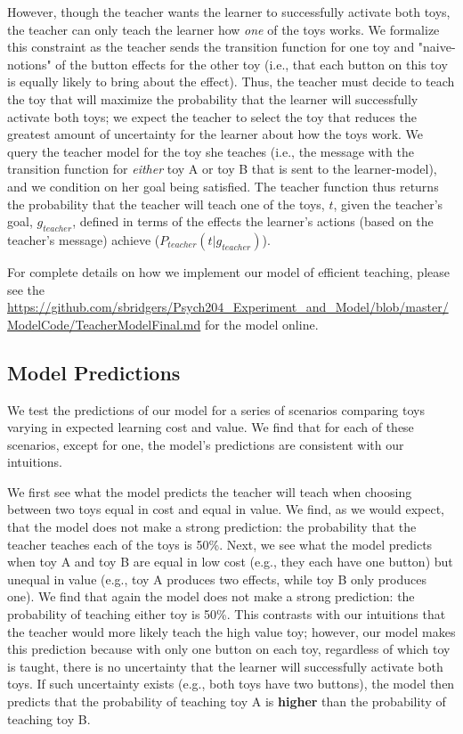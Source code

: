 \documentclass[10pt,letterpaper]{article}
\begin{document}
However, though the teacher wants the learner to successfully activate both toys, the teacher can only teach the learner how \textit{one} of the toys works. We formalize this constraint as the teacher sends the transition function for one toy and "naive-notions" of the button effects for the other toy (i.e., that each button on this toy is equally likely to bring about the effect). Thus, the teacher must decide to teach the toy that will maximize the probability that the learner will successfully activate both toys; we expect the teacher to select the toy that reduces the greatest amount of uncertainty for the learner about how the toys work. We query the teacher model for the toy she teaches (i.e., the message with the transition function for \textit{either} toy A or toy B that is sent to the learner-model), and we condition on her goal being satisfied. The teacher function thus returns the probability that the teacher will teach one of the toys, $t$, given the teacher's goal, $g_{teacher}$, defined in terms of the effects the learner's actions (based on the teacher's message) achieve ($P_{teacher}(t | g_{teacher})$).

For complete details on how we implement our model of efficient teaching, please see the \url{https://github.com/sbridgers/Psych204_Experiment_and_Model/blob/master/ModelCode/TeacherModelFinal.md} for the model online.

\subsection{Model Predictions}

We test the predictions of our model for a series of scenarios comparing toys varying in expected learning cost and value. We find that for each of these scenarios, except for one, the model's predictions are consistent with our intuitions. 

We first see what the model predicts the teacher will teach when choosing between two toys equal in cost and equal in value. We find, as we would expect, that the model does not make a strong prediction: the probability that the teacher teaches each of the toys is 50\%. Next, we see what the model predicts when toy A and toy B are equal in low cost (e.g., they each have one button) but unequal in value (e.g., toy A produces two effects, while toy B only produces one). We find that again the model does not make a strong prediction: the probability of teaching either toy is 50\%. This contrasts with our intuitions that the teacher would more likely teach the high value toy; however, our model makes this prediction because with only one button on each toy, regardless of which toy is taught, there is no uncertainty that the learner will successfully activate both toys. If such uncertainty exists (e.g., both toys have two buttons), the model then predicts that the probability of teaching toy A is \textbf{higher} than the probability of teaching toy B. 
\end{document}
